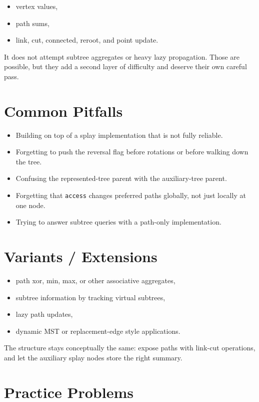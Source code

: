 \begin{itemize}
  \item vertex values,
  \item path sums,
  \item link, cut, connected, reroot, and point update.
\end{itemize}

It does not attempt subtree aggregates or heavy lazy propagation. Those are possible, but they add a second layer of
difficulty and deserve their own careful pass.

\section*{Common Pitfalls}

\begin{itemize}
  \item Building on top of a splay implementation that is not fully reliable.
  \item Forgetting to push the reversal flag before rotations or before walking down the tree.
  \item Confusing the represented-tree parent with the auxiliary-tree parent.
  \item Forgetting that \texttt{access} changes preferred paths globally, not just locally at one node.
  \item Trying to answer subtree queries with a path-only implementation.
\end{itemize}

\section*{Variants / Extensions}

\begin{itemize}
  \item path xor, min, max, or other associative aggregates,
  \item subtree information by tracking virtual subtrees,
  \item lazy path updates,
  \item dynamic MST or replacement-edge style applications.
\end{itemize}

The structure stays conceptually the same: expose paths with link-cut operations, and let the auxiliary splay nodes
store the right summary.

\section*{Practice Problems}

